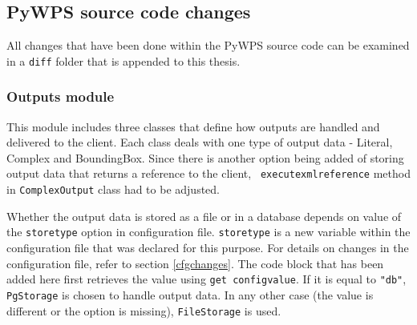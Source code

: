 \subsection{PyWPS source code changes} 

All changes that have been done within the PyWPS source code can be
examined in a \texttt{diff} folder that is appended to this thesis.


\subsubsection{Outputs module}

This module includes three classes that define how outputs are handled
and delivered to the client. Each class deals with one type of output
data - Literal, Complex and BoundingBox.
Since there is another option being added of storing output data that
returns a reference to the client, \texttt{\textunderscore
  execute\textunderscore xml\textunderscore reference} method in \texttt{ComplexOutput} class had to
be adjusted.

Whether the output data is stored as a file or in a database depends
on value of the \texttt{store\textunderscore type} option in
configuration file. \texttt{store\textunderscore type} is a new
variable within the configuration file that was declared for
this purpose. For details on changes in the configuration file,
refer to section \ref{cfgchanges}. The code block that has been added here
first retrieves the value using \texttt{get\textunderscore
  config\textunderscore value}. If it is equal to \texttt{"db"},
\texttt{PgStorage} is chosen to handle output data. In any other case
(the value is different or the option is missing),
\texttt{FileStorage} is used.

